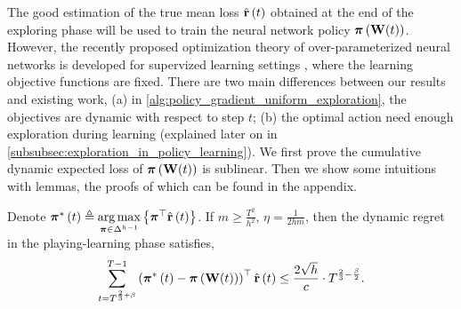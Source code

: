 The good estimation of the true mean loss $\hat{{\mathbf{r}}}\left(t\right)$ obtained at the end of the exploring phase will be used to train the neural network policy ${\boldsymbol{\pi}}\left( {\mathbf{W}}(t) \right)$. However, the recently proposed optimization theory of over-parameterized neural networks is developed for supervized learning settings \citep{li2018learning,allen2018convergenceB}, where the learning objective functions are fixed. There are two main differences between our results and existing work, (a) in \cref{alg:policy_gradient_uniform_exploration}, the objectives are dynamic with respect to step $t$; (b) the optimal action need enough exploration during learning (explained later on in \cref{subsubsec:exploration_in_policy_learning}). We first prove the cumulative dynamic expected loss of ${\boldsymbol{\pi}}\left( {\mathbf{W}}(t) \right)$ is sublinear. Then we show some intuitions with lemmas, the proofs of which can be found in the appendix.
\begin{thm}
\label{thm:dynamic_regret_sublinear}
    Denote ${\boldsymbol{\pi}}^*\left(t\right) \triangleq \operatorname*{arg\,max}\limits_{{\boldsymbol{\pi}} \in \Delta^{h-1}}{\left\{ {\boldsymbol{\pi}}^\top \hat{{\mathbf{r}}}\left(t\right)\right\}}$. If $m \ge \frac{T^2}{h^2}$, $\eta = \frac{1}{2 h m}$, then the dynamic regret in the playing-learning phase satisfies,
\begin{equation*}
\begin{split}
    \sum\limits_{t=T^{\frac{2}{3}+ \beta}}^{T-1}{ \left(  {{\boldsymbol{\pi}}^*\left(t\right)} - {\boldsymbol{\pi}}\left( {\mathbf{W}}(t) \right) \right)^\top \hat{{\mathbf{r}}}\left(t\right) } \le \frac{2 \sqrt{h}}{c} \cdot T^{\frac{2}{3} - \frac{\beta}{2}}.
\end{split}
\end{equation*}
\end{thm}
